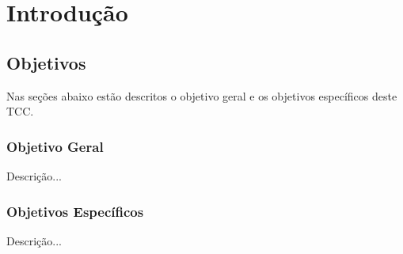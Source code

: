\chapter{Introdução}

\section{Objetivos}

Nas seções abaixo estão descritos o objetivo geral e os objetivos específicos deste TCC.

\subsection{Objetivo Geral}

Descrição...

\subsection{Objetivos Específicos}

Descrição...